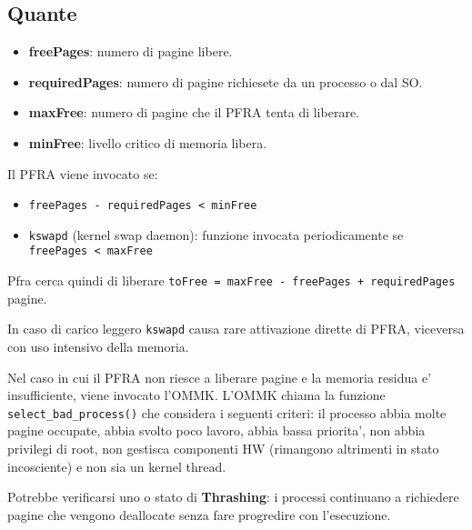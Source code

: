\documentclass[12pt, a4paper]{report}
\begin{document}
\subsection{Quante}
\begin{itemize}
	\item \textbf{freePages}: numero di pagine libere.
	\item \textbf{requiredPages}: numero di pagine richiesete da un processo o
		dal SO.
	\item \textbf{maxFree}: numero di pagine che il PFRA tenta di liberare.
	\item \textbf{minFree}: livello critico di memoria libera.
\end{itemize}
Il PFRA viene invocato se:
\begin{itemize}
	\item \texttt{freePages - requiredPages < minFree}
	\item \texttt{kswapd} (kernel swap daemon): funzione invocata periodicamente
		se \texttt{freePages < maxFree}
\end{itemize}
Pfra cerca quindi di liberare \texttt{toFree = maxFree - freePages +
requiredPages} pagine.

In caso di carico leggero \texttt{kswapd} causa rare attivazione dirette di
PFRA, viceversa con uso intensivo della memoria.

Nel caso in cui il PFRA non riesce a liberare pagine e la memoria residua e'
insufficiente, viene invocato l'OMMK. L'OMMK chiama la funzione
\texttt{select\_bad\_process()} che considera i seguenti criteri: il processo
abbia molte pagine occupate, abbia svolto poco lavoro, abbia bassa priorita',
non abbia privilegi di root, non gestisca componenti HW (rimangono altrimenti in
stato incosciente) e non sia un kernel thread. 

Potrebbe verificarsi uno o stato di \textbf{Thrashing}: i processi
continuano a richiedere pagine che vengono deallocate senza fare progredire con
l'esecuzione.
\end{document}
